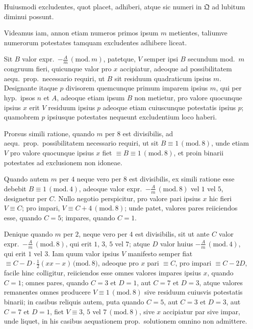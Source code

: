 \documentclass[12pt,a4paper]{article}
\theoremstyle{plain}
\theoremstyle{definition}
\theoremstyle{remark}
\newcommand{\Q}{\mathfrak{Q}}
\begin{document}
Huiusmodi excludentes, quot placet, adhiberi, atque sic numeri in $\Q$ ad lubitum diminui possunt.

Videamus iam, annon etiam numeros primos ipsum $m$ metientes, taliumve numerorum potestates tamquam excludentes adhibere liceat.

Sit $B$ valor expr.~$-\frac{A}{m}\,(\mathrm{mod.}\,m)$, patetque, $V$ semper ipsi $B$ secundum mod.\ $m$ congruum fieri, quicunque valor pro $x$ accipiatur, adeoque ad possibilitatem aequ.\ prop.\ necessario requiri, ut $B$ sit residuum quadraticum ipsius $m$. Designante itaque $p$ divisorem quemcunque primum imparem ipsius $m$, qui per hyp.\ ipsos $n$ et $A$, adeoque etiam ipsum $B$ non metietur, pro valore quocunque ipsius $x$ erit $V$ residuum ipsius $p$ adeoque etiam cuiuscunque potestatis ipsius $p$; quamobrem $p$ ipsiusque potestates nequeunt excludentium loco haberi.

Prorsus simili ratione, quando $m$ per $8$ est divisibilis, ad aequ.\ prop.\ possibilitatem necessario requiri, ut sit $B\equiv 1\,(\mathrm{mod.}\,8)$, unde etiam $V$ pro valore quocunque ipsius $x$ fiet $\equiv B\equiv 1\,(\mathrm{mod.}\,8)$, et proin binarii potestates ad exclusionem non idoneae.

Quando autem $m$ per $4$ neque vero per $8$ est divisibilis, ex simili ratione esse debebit $B\equiv 1\,(\mathrm{mod.}\,4)$, adeoque valor expr.~$-\frac{A}{m}\,(\mathrm{mod.}\,8)$ vel $1$ vel $5$, designetur per $C$. Nullo negotio perspicitur, pro valore pari ipsius $x$ hic fieri $V\equiv C$; pro impari, $V\equiv C+4\,(\mathrm{mod.}\,8)$; unde patet, valores pares reiiciendos esse, quando $C=5$; impares, quando $C=1$.

Denique quando $m$ per $2$, neque vero per $4$ est divisibilis, sit ut ante $C$ valor expr.~$-\frac{A}{m}\,(\mathrm{mod.}\,8)$, qui erit $1$, $3$, $5$ vel $7$; atque $D$ valor huius $-\frac{A}{m}\,(\mathrm{mod.}\,4)$, qui erit $1$ vel $3$. Iam quum valor ipsius $V$ manifesto semper fiat $\equiv C-D\cdot\frac{1}{2}(xx-x)\,\mathrm{(mod.}\,8)$, adeoque pro $x$ pari $\equiv C$, pro impari $\equiv C-2D$, facile hinc colligitur, reiiciendos esse omnes valores impares ipsius $x$, quando $C=1$; omnes pares, quando $C=3$ et $D=1$, aut $C=7$ et $D=3$, atque valores remanentes omnes producere $V\equiv 1\,(\mathrm{mod.}\,8)$ sive residuum cuiusvis potestatis binarii; in casibus reliquis autem, puta quando $C=5$, aut $C=3$ et $D=3$, aut $C=7$ et $D=1$, fiet $V\equiv 3$, $5$ vel $7\,(\mathrm{mod.}\,8)$, sive $x$ accipiatur par sive impar, unde liquet, in his casibus aequationem prop.\ solutionem omnino non admittere.
\end{document}
